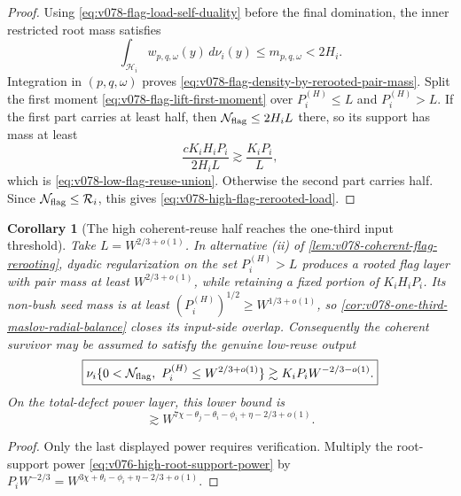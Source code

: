 \documentclass[10pt]{article}
\newtheorem{corollary}[theorem]{Corollary}
\begin{document}
\begin{proof}
Using \eqref{eq:v078-flag-load-self-duality} before the final domination, the inner restricted root
mass satisfies
\[
\int_{\mathcal H_i}w_{p,q,\omega}(y)\,d\nu_i(y)
\le
m_{p,q,\omega}<2H_i.
\]
Integration in \((p,q,\omega)\) proves
\eqref{eq:v078-flag-density-by-rerooted-pair-mass}.  Split the first moment
\eqref{eq:v078-flag-lift-first-moment} over
\(P_i^{(H)}\le L\) and \(P_i^{(H)}>L\).  If the first part carries at least half, then
\(\mathcal N_{\rm flag}\le2H_iL\) there, so its support has mass at least
\[
\frac{cK_iH_iP_i}{2H_iL}
\gtrsim
\frac{K_iP_i}{L},
\]
which is \eqref{eq:v078-low-flag-reuse-union}.  Otherwise the second part carries half.  Since
\(\mathcal N_{\rm flag}\le\mathcal R_i\), this gives
\eqref{eq:v078-high-flag-rerooted-load}.
\end{proof}

\begin{corollary}[The high coherent-reuse half reaches the one-third input threshold]
\label{cor:v078-coherent-high-reuse-closes}
Take \(L=W^{2/3+o(1)}\).  In alternative 
\textnormal{(ii)} of \cref{lem:v078-coherent-flag-rerooting}, dyadic regularization on the set
\(P_i^{(H)}>L\) produces a rooted flag layer with pair mass at least \(W^{2/3+o(1)}\), while
retaining a fixed portion of \(K_iH_iP_i\).  Its non-bush seed mass is at least
\((P_i^{(H)})^{1/2}\ge W^{1/3+o(1)}\), so
\cref{cor:v078-one-third-maslov-radial-balance} closes its input-side overlap.  Consequently the coherent survivor may
be assumed to satisfy the genuine low-reuse output
\begin{equation}
\label{eq:v078-final-low-reuse-direction-mass}
\boxed{
\nu_i\{0<\mathcal N_{\rm flag},\ P_i^{(H)}\le W^{2/3+o(1)}\}
\gtrsim
K_iP_iW^{-2/3-o(1)}.
}
\end{equation}
On the total-defect power layer, this lower bound is
\begin{equation}
\label{eq:v078-final-low-reuse-direction-power}
\boxed{
\gtrsim
W^{7\chi-\theta_j-\theta_i-\phi_i+\eta-2/3+o(1)}.
}
\end{equation}
\end{corollary}

\begin{proof}
Only the last displayed power requires verification.  Multiply the root-support power
\eqref{eq:v076-high-root-support-power} by
\(P_iW^{-2/3}=W^{3\chi+\theta_i-\phi_i+\eta-2/3+o(1)}\).
\end{proof}
\end{document}
